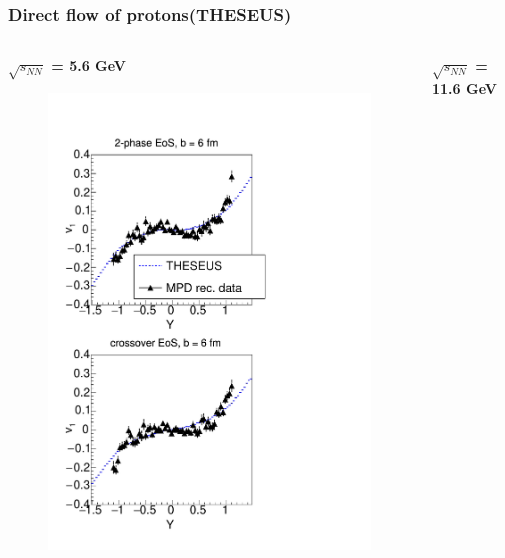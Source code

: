 \documentclass[dvipsnames] {beamer}
\begin{document}
 
 \begin{frame}[shrink=5]
   \frametitle{Direct flow of protons(THESEUS)}
   \begin{columns}[c]
     \begin{block}{\bf \centering $\sqrt{s_{NN}}$ = 5.6 GeV}
        \begin{figure}[H]
      \includegraphics[width=1.\textwidth]{energy15AGeV_proton_urqON.pdf}
        \end{figure}
     \end{block}
     \begin{block}{\bf \centering $\sqrt{s_{NN}}$ = 11.6 GeV}
        \begin{figure}[H]

\end{figure}
\end{block}
\end{columns}
\end{frame}
\end{document}
